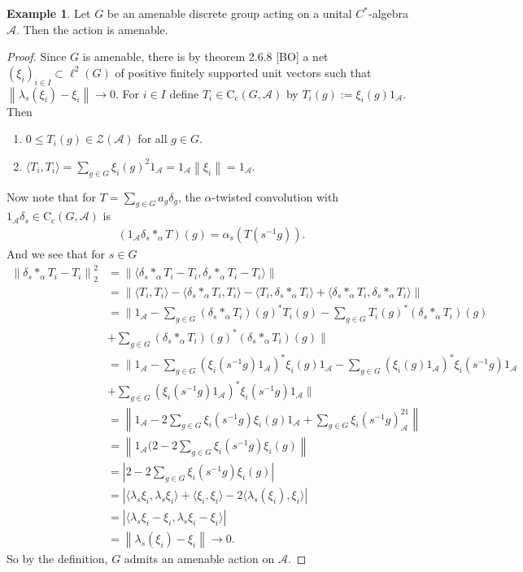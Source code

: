 \documentclass[10pt,oneside,openany,final]{memoir}
\theoremstyle{definition}
\theoremstyle{Break}
\newtheorem*{example}{Example}
\newcommand{\lv}{\left\lVert}
\newcommand{\rv}{\right\rVert}
\newcommand{\A}{\mathcal{A}}
\newcommand{\cc}{\text{C}_{\text{c}}}
\begin{document}
\begin{example}
Let $G$ be an amenable discrete group acting on a unital $C^*$-algebra $\A$. Then the action is amenable.
\begin{proof}
Since $G$ is amenable, there is by theorem 2.6.8 [BO] a net $(\xi_{i})_{i \in I} \subset \ell^2(G)$ of positive finitely supported unit vectors such that $\lv \lambda_{s} (\xi_{i})-\xi_{i}\rv \to 0$. For $i \in I$ define $T_{i}\in \cc(G,\A)$ by $T_{i}(g):=\xi_{i}(g) 1_{\A}$. Then 
\begin{enumerate}
\item $0 \leq T_{i}(g) \in \mathcal{Z}(\A)$ for all $g \in G$.
\item $\langle T_{i},T_{i}\rangle= \sum_{g \in G} \xi_{i}(g)^2 1_{\A}=1_{\A} \lv \xi_{i} \rv=1_{\A}$.
\end{enumerate}
Now note that for $T=\sum_{g \in G} a_{g} \delta_{g}$, the $\alpha$-twisted convolution with $1_{\A}\delta_{s} \in \cc(G,\A)$ is 
\begin{align*}
(1_{\A} \delta_{s} \ast_{\alpha} T)(g)=\alpha_{s}(T(s^{-1}g)).
\end{align*}
And we see that for $s \in G$
\begin{align*}
\lv \delta_{s} \ast_{\alpha} T_{i}-T_{i}\rv_{2}^2&=\lv \langle \delta_{s} \ast_{\alpha}T_{i}-T_{i}, \delta_{s} \ast_{\alpha}T_{i}-T_{i}\rangle \rv\\
&=\lv \langle T_{i},T_{i} \rangle - \langle \delta_{s} \ast_{\alpha} T_{i},T_{i} \rangle-\langle T_{i},\delta_{s} \ast_{\alpha} T_{i}\rangle+\langle\delta_{s} \ast_{\alpha} T_{i},\delta_{s} \ast_{\alpha} T_{i}\rangle \rv\\
&=\big\lVert 1_{\A}-\sum_{g \in G} (\delta_{s} \ast_{\alpha} T_{i})(g)^*T_{i}(g)-\sum_{g \in G} T_{i}(g)^*(\delta_{s} \ast_{\alpha} T_{i})(g)\\ 
&+\sum_{g \in G} (\delta_{s} \ast_{\alpha} T_{i})(g)^*(\delta_{s} \ast_{\alpha} T_{i})(g)\big\rVert\\
&=\lVert 1_{\A} - \sum_{g \in G} (\xi_{i}(s^{-1}g)1_{\A})^*\xi_{i}(g)1_{\A}-\sum_{g \in G}(\xi_{i}(g)1_{\A})^*\xi_{i}(s^{-1}g)1_{\A}\\
&+\sum_{g \in G}(\xi_{i}(s^{-1}g)1_{\A})^*\xi_{i}(s^{-1}g)1_{\A}\rVert\\
&=\lv 1_{\A}-2 \sum_{g \in G} \xi_{i}(s^{-1}g) \xi_{i}(g)1_{\A}+\sum_{g \in G} \xi_{i}(s^{-1}g)^21_{\A}\rv\\
&=\lv 1_{\A}(2-2\sum_{g \in G}\xi_{i}(s^{-1}g)\xi_{i}(g)\rv\\
&=|2  -2\sum_{g \in G}\xi_{i}(s^{-1}g)\xi_{i}(g)|\\
&=|\langle\lambda_{s} \xi_{i},\lambda_{s} \xi_{i}\rangle+ \langle \xi_{i},\xi_{i}\rangle -2\langle \lambda_{s}(\xi_{i}), \xi_{i}\rangle|\\
&=|\langle \lambda_{s} \xi_{i}-\xi_{i}, \lambda_{s} \xi_{i}-\xi_{i} \rangle|\\
&=\lv \lambda_{s}(\xi_{i})-\xi_{i}\rv \to 0.
\end{align*}
So by the definition, $G$ admits an amenable action on $\A$.
\end{proof}
\end{example}
\end{document}
